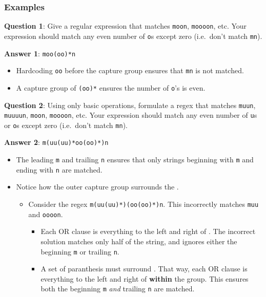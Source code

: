 \documentclass[
  letterpaper,
  DIV=11,
  numbers=noendperiod]{scrreprt}
\providecommand{\tightlist}{%
  \setlength{\itemsep}{0pt}\setlength{\parskip}{0pt}}\usepackage{longtable,booktabs,array}
\begin{document}
\hypertarget{examples}{%
\subsubsection{Examples}\label{examples}}

\textbf{Question 1}: Give a regular expression that matches
\texttt{moon}, \texttt{moooon}, etc. Your expression should match any
even number of \texttt{o}s except zero (i.e.~don't match \texttt{mn}).

\textbf{Answer 1}: \texttt{moo(oo)*n}

\begin{itemize}
\tightlist
\item
  Hardcoding \texttt{oo} before the capture group ensures that
  \texttt{mn} is not matched.
\item
  A capture group of \texttt{(oo)*} ensures the number of \texttt{o}'s
  is even.
\end{itemize}

\textbf{Question 2}: Using only basic operations, formulate a regex that
matches \texttt{muun}, \texttt{muuuun}, \texttt{moon}, \texttt{moooon},
etc. Your expression should match any even number of \texttt{u}s or
\texttt{o}s except zero (i.e.~don't match \texttt{mn}).

\textbf{Answer 2}: \texttt{m(uu(uu)*\textbar{}oo(oo)*)n}

\begin{itemize}
\tightlist
\item
  The leading \texttt{m} and trailing \texttt{n} ensures that only
  strings beginning with \texttt{m} and ending with \texttt{n} are
  matched.
\item
  Notice how the outer capture group surrounds the \texttt{\textbar{}}.

  \begin{itemize}
  \tightlist
  \item
    Consider the regex \texttt{m(uu(uu)*)\textbar{}(oo(oo)*)n}. This
    incorrectly matches \texttt{muu} and \texttt{oooon}.

    \begin{itemize}
    \tightlist
    \item
      Each OR clause is everything to the left and right of
      \texttt{\textbar{}}. The incorrect solution matches only half of
      the string, and ignores either the beginning \texttt{m} or
      trailing \texttt{n}.
    \item
      A set of paranthesis must surround \texttt{\textbar{}}. That way,
      each OR clause is everything to the left and right of
      \texttt{\textbar{}} \textbf{within} the group. This ensures both
      the beginning \texttt{m} \emph{and} trailing \texttt{n} are
      matched.
    \end{itemize}
  \end{itemize}
\end{itemize}
\end{document}
